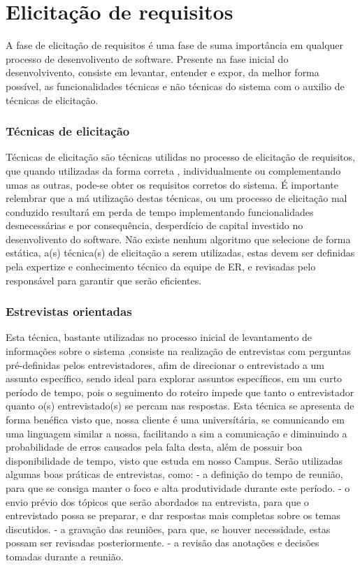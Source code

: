 \chapter{Elicitação de requisitos}
A fase de elicitação de requisitos é uma fase de suma importância em qualquer processo de  desenvolivento de software. 
Presente na fase inicial do desenvolvivento, consiste em levantar, entender e expor, da melhor forma possível, as funcionalidades técnicas e não técnicas do sistema
com o auxilio de técnicas de elicitação.

  \subsection{Técnicas de elicitação}
  Técnicas de elicitação são técnicas utilidas no processo de elicitação de requisitos, que quando utilizadas da forma correta
  , individualmente ou complementando umas as outras, pode-se obter os requisitos corretos do sistema.
  É importante relembrar que a má utilização destas técnicas, ou um processo de elicitação 
  mal conduzido resultará em perda de tempo implementando funcionalidades desnecessárias e por 
  consequência, desperdício de capital investido no desenvolivento do software.
  Não existe nenhum algoritmo que selecione de forma estática, a(s) técnica(s) de elicitação a serem utilizadas, 
  estas devem ser definidas pela expertize e conhecimento técnico da equipe de ER, e revisadas pelo responsável para garantir
  que serão eficientes.
  
  \subsection{Estrevistas orientadas}
  Esta técnica, bastante utilizadas no processo inicial de levantamento de informações sobre o sistema
  ,consiste na realização de entrevistas com perguntas pré-definidas pelos entrevistadores, afim de direcionar o 
  entrevistado a um assunto específico, sendo ideal para explorar assuntos específicos, em um curto período de tempo,
  pois o seguimento do roteiro impede que tanto o entrevistador quanto o(s) entrevistado(s) se percam nas respostas. Esta 
  técnica se apresenta de forma benéfica visto que, nossa cliente é uma universítária, se comunicando em uma linguagem 
  similar a nossa, facilitando a sim a comunicação e diminuindo a probabilidade de erros causados pela falta desta, além de
  possuir boa disponibilidade de tempo, visto que estuda em nosso Campus.
  Serão utilizadas algumas boas práticas de entrevistas, como: 
  - a definição do tempo de reunião, para que se consiga manter o foco
  e alta produtividade durante este período.
  - o envio prévio dos tópicos que serão abordados na entrevista, para que o entrevistado possa se preparar, e dar respostas mais
  completas sobre os temas discutidos.
  - a gravação das reuniões, para que, se houver necessidade, estas possam ser revisadas posteriormente.
  - a revisão das anotações e decisões tomadas durante a reunião.
  
